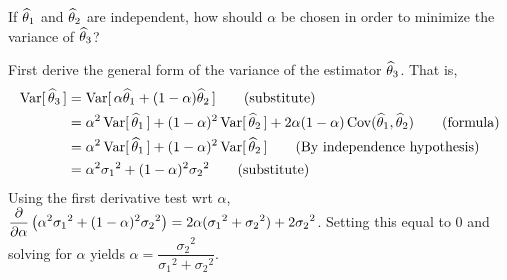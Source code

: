 If $\widehat{\theta}_1$ and $\widehat{\theta}_2$ are independent, how should $\alpha$ be chosen in order to minimize the variance of $\widehat{\theta}_3$?

\soln* First derive the general form of the variance of the estimator $\widehat{\theta}_3$. That is, 
\begin{align*}
    \Varb*{\that_3} &= \Varb*{\alpha \that_1 + (1-\alpha)\that_2} \tag{substitute}\\
    &= \alpha^2 \Varb*{\that_1} + (1-\alpha)^2 \Varb*{\that_2} + 2\alpha(1-\alpha) \Cov(\that_1, \that_2) \tag{formula}\\
    &= \alpha^2 \Varb*{\that_1} + (1-\alpha)^2 \Varb*{\that_2} \tag{By independence hypothesis}\\
    &= \alpha^2 {\sigma_1}^2 + (1-\alpha)^2 {\sigma_2}^2 \tag{substitute}
\end{align*}
Using the first derivative test wrt $\alpha$, 
$\displaystyle \pdv{\alpha} \pars{\alpha^2 {\sigma_1}^2 + (1-\alpha)^2 {\sigma_2}^2} = 2\alpha({\sigma_1}^2 + {\sigma_2}^2) + 2{\sigma_2}^2$. Setting this equal to 0 and solving for $\alpha$ yields 
$\alpha = \dfrac{{\sigma_2}^2}{{\sigma_1}^2+{\sigma_2}^2}$.

